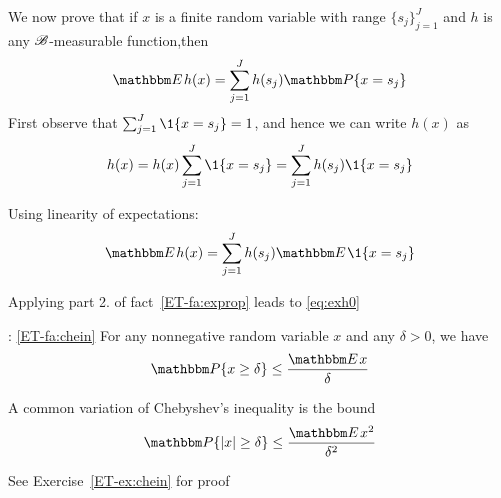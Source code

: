 \begin{frame}

    \vspace{2em}
    We now prove that if $x$ is a finite
    random variable with range $\{s_j\}_{j=1}^J$ and $h$ is 
    any $\mathscr B$-measurable function,then
    \begin{equation}
        \label{eq:exh0}
        \EE h(x) = \sum_{j=1}^J h(s_j) \PP\{x = s_j\}
    \end{equation}
    First observe that $\sum_{j=1}^J \1\{x = s_j\} = 1$, and hence we can
    write $h(x)$ as 
    \begin{equation*}
        h(x) 
        = h(x) \sum_{j=1}^J \1\{x = s_j\}  
        = \sum_{j=1}^J h(s_j) \1\{x = s_j\}
    \end{equation*}
    
\end{frame}

\begin{frame}
    
    \vspace{2em}
    Using linearity of expectations:
        $$\EE h(x) =  \sum_{j=1}^J h(s_j) \EE \1\{x = s_j\}$$
    
    Applying part 2. of fact~\ref{ET-fa:exprop} leads to \eqref{eq:exh0}
    
\end{frame}

\begin{frame}
    
    \vspace{2em}
    
    :
    \Fact\eqref{ET-fa:chein}
        For any nonnegative random variable $x$ and any $\delta > 0$, we have
        \begin{equation}
            \label{eq:chein0}
            \PP\{x \geq \delta \} \leq \frac{\EE x}{\delta}
        \end{equation}
    
    A common variation of Chebyshev's inequality is the bound
    \begin{equation}
        \label{eq:chein}
        \PP\{|x| \geq \delta \} \leq \frac{\EE x^2}{\delta^2}
    \end{equation}
    
    
    See Exercise~\ref{ET-ex:chein} for proof
    
\end{frame}

